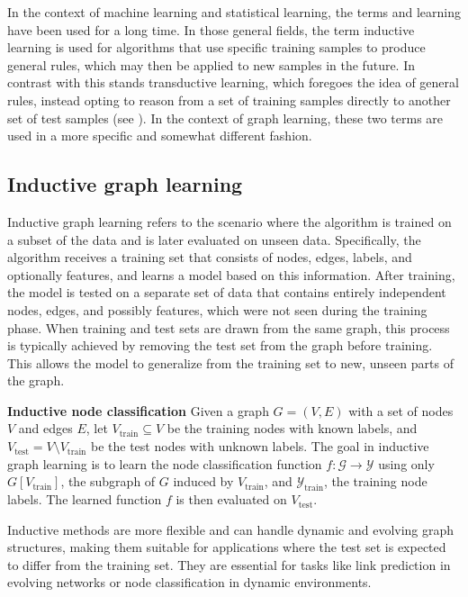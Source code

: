 In the context of machine learning and statistical learning, the terms  and  learning have been used for a long time. In those general fields, the term inductive learning is used for algorithms that use specific training samples to produce general rules, which may then be applied to new samples in the future. In contrast with this stands transductive learning, which foregoes the idea of general rules, instead opting to reason from a set of training samples directly to another set of test samples (see \cite{vapnik_nature_1995}). In the context of graph learning, these two terms are used in a more specific and somewhat different fashion.


\subsection{Inductive graph learning}

Inductive graph learning refers to the scenario where the algorithm is trained on a subset of the data and is later evaluated on unseen data. Specifically, the algorithm receives a training set that consists of nodes, edges, labels, and optionally features, and learns a model based on this information. After training, the model is tested on a separate set of data that contains entirely independent nodes, edges, and possibly features, which were not seen during the training phase. When training and test sets are drawn from the same graph, this process is typically achieved by removing the test set from the graph before training. This allows the model to generalize from the training set to new, unseen parts of the graph.

\begin{example}\textbf{Inductive node classification}
	Given a graph \( G = \left( V, E \right) \) with a set of nodes \( V \) and edges \( E \), let \( V_\mathrm{train} \subseteq V \) be the training nodes with known labels, and \( V_\mathrm{test} = V \setminus V_\mathrm{train} \) be the test nodes with unknown labels. The goal in inductive graph learning is to learn the node classification function \( f: \mathcal{G} \rightarrow \mathcal{Y} \) using only \( G \left[ V_\mathrm{train} \right] \), the subgraph of \( G \) induced by \( V_\mathrm{train} \), and \( \mathcal{Y}_\mathrm{train} \), the training node labels. The learned function \( f \) is then evaluated on \( V_\mathrm{test} \).
\end{example}

Inductive methods are more flexible and can handle dynamic and evolving graph structures, making them suitable for applications where the test set is expected to differ from the training set. They are essential for tasks like link prediction in evolving networks or node classification in dynamic environments.

